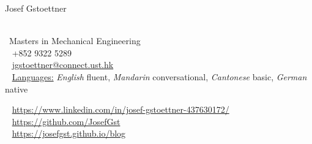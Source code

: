 \documentclass{modernsimplecv}
\begin{document}
\begin{minipage}[t]{0.77\textwidth}
\vspace{0pt} %
\begin{shaded*}

\vspace{0pt} %
{\par\centering\huge{Josef Gstoettner}} \\[0.3cm]

{\small
\faGraduationCap~Masters in Mechanical Engineering \\
\faPhone~ +852 9322 5289 \\
\faAt~ \protect\url{jgstoettner@connect.ust.hk} \\
\faComment~ \underline{Languages:} \emph{English} fluent, \emph{Mandarin} conversational, \emph{Cantonese} basic, \emph{German} native}



\faLinkedin~ \protect\url{https://www.linkedin.com/in/josef-gstoettner-437630172/} \\
\faGithub~ \protect\url{https://github.com/JosefGst} \\
\faRss~ \protect\url{https://josefgst.github.io/blog} \\
\hfill
\end{shaded*}
\end{minipage}\\[15pt]



\subsection*{}
\vspace{-3em}
\end{document}
